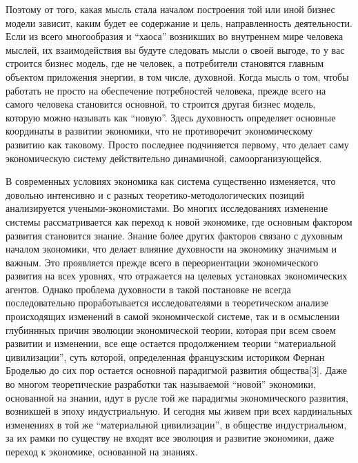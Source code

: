 \begin{multicols}{2}
Поэтому от того, какая мысль стала началом построения той или иной
бизнес модели зависит, каким будет ее содержание и цель, направленность
деятельности. Если из всего многообразия и ``хаоса'' возникших во
внутреннем мире человека мыслей, их взаимодействия вы будуте следовать
мысли о своей выгоде, то у вас строится бизнес модель, где не человек, а
потребители становятся главным объектом приложения энергии, в том числе,
духовной. Когда мысль о том, чтобы работать не просто на обеспечение
потребностей человека, прежде всего на самого человека становится
основной, то строится другая бизнес модель, которую можно называть как
``новую''. Здесь духовность определяет основные координаты в развитии
экономики, что не противоречит экономическому развитию как таковому.
Просто последнее подчиняется первому, что делает саму экономическую
систему действительно динамичной, самоорганизующейся.

В современных условиях экономика как система существенно изменяется, что
довольно интенсивно и с разных теоретико-методологических позиций
анализируется учеными-экономистами. Во многих исследованиях изменение
системы рассматривается как переход к новой экономике, где основным
фактором развития становится знание. Знание более других факторов
связано с духовным началом экономики, что делает влияние духовности на
экономику значимым и важным. Это проявляется прежде всего в
переориентации экономического развития на всех уровнях, что отражается
на целевых установках экономических агентов. Однако проблема духовности
в такой постановке не всегда последовательно проработывается
исследователями в теоретическом анализе происходящих изменений в самой
экономической системе, так и в осмыслении глубиннных причин эволюции
экономической теории, которая при всем своем развитии и изменении, все
еще остается продолжением теории ``материальной цивилизации'', суть
которой, определенная французским историком Фернан Броделью до сих пор
остается основной парадигмой развития общества{[}3{]}. Даже во многом
теоретические разработки так называемой ``новой'' экономики, основанной
на знании, идут в русле той же парадигмы экономического развития,
возникшей в эпоху индустриальную. И сегодня мы живем при всех
кардинальных изменениях в той же ``материальной цивилизации'', в
обществе индустриальном, за их рамки по существу не входят все эволюция
и развитие экономики, даже переход к экономике, основанной на знаниях.


\end{multicols}
